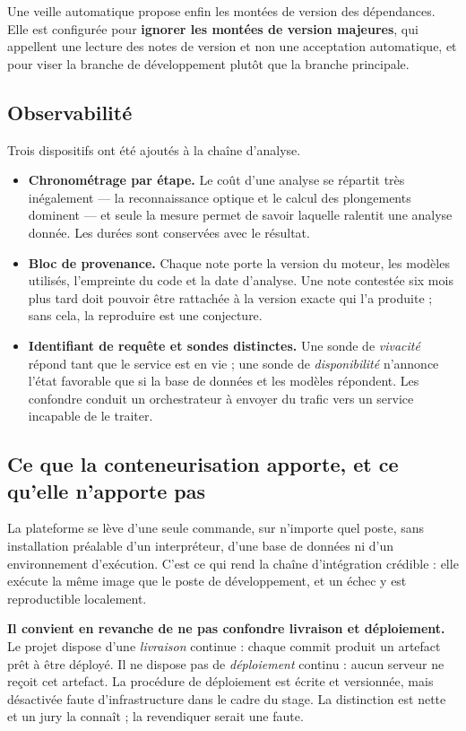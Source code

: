 \documentclass[11pt,a4paper]{article}
\begin{document}
Une veille automatique propose enfin les montées de version des dépendances. Elle est configurée pour \textbf{ignorer les montées de version majeures}, qui appellent une lecture des notes de version et non une acceptation automatique, et pour viser la branche de développement plutôt que la branche principale.

\subsection{Observabilité}
Trois dispositifs ont été ajoutés à la chaîne d'analyse.

\begin{itemize}[leftmargin=1.5em, itemsep=2pt]
  \item \textbf{Chronométrage par étape.} Le coût d'une analyse se répartit très inégalement --- la reconnaissance optique et le calcul des plongements dominent --- et seule la mesure permet de savoir laquelle ralentit une analyse donnée. Les durées sont conservées avec le résultat.
  \item \textbf{Bloc de provenance.} Chaque note porte la version du moteur, les modèles utilisés, l'empreinte du code et la date d'analyse. Une note contestée six mois plus tard doit pouvoir être rattachée à la version exacte qui l'a produite ; sans cela, la reproduire est une conjecture.
  \item \textbf{Identifiant de requête et sondes distinctes.} Une sonde de \emph{vivacité} répond tant que le service est en vie ; une sonde de \emph{disponibilité} n'annonce l'état favorable que si la base de données et les modèles répondent. Les confondre conduit un orchestrateur à envoyer du trafic vers un service incapable de le traiter.
\end{itemize}

\subsection{Ce que la conteneurisation apporte, et ce qu'elle n'apporte pas}
La plateforme se lève d'une seule commande, sur n'importe quel poste, sans installation préalable d'un interpréteur, d'une base de données ni d'un environnement d'exécution. C'est ce qui rend la chaîne d'intégration crédible : elle exécute la même image que le poste de développement, et un échec y est reproductible localement.

\medskip
\noindent\textbf{Il convient en revanche de ne pas confondre livraison et déploiement.} Le projet dispose d'une \emph{livraison} continue : chaque commit produit un artefact prêt à être déployé. Il ne dispose pas de \emph{déploiement} continu : aucun serveur ne reçoit cet artefact. La procédure de déploiement est écrite et versionnée, mais désactivée faute d'infrastructure dans le cadre du stage. La distinction est nette et un jury la connaît ; la revendiquer serait une faute.
\end{document}
